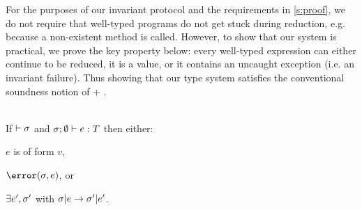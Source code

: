 For the purposes of our invariant protocol and the requirements in \autoref{s:proof}, we do not require that well-typed programs do not get stuck during reduction, e.g. because a non-existent method is called.
However, to show that our system is practical, we prove the key property below:
every well-typed expression can either continue to be reduced, it is a value, or it contains an uncaught exception (i.e. an invariant failure).
Thus showing that our type system satisfies the conventional soundness notion of  + .

\SS\begin{theorem}[Progress]\ \\
	\indent If $\vdash \sigma$ and $\tyr{e}{T}$ then either:
	\begin{iitemize}
		\item $e$ is of form $v$,\SS
		\item $\error(\s, e)$, or\SS
		\item $\exists e',\sigma'$ with $\sigma|e \rightarrow \sigma'|e'$.
	\end{iitemize}
\end{theorem}
